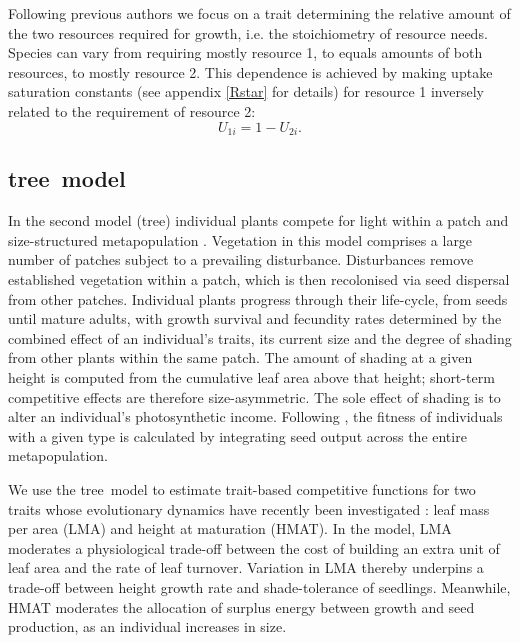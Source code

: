 \documentclass[a4paper,11pt]{article}
\newcommand{\TREE}{{\sc tree}}
\begin{document}
Following previous authors \citep{Tilman-1985, Schreiber-2003, Fox-2008} we
focus on a trait determining the relative amount of the two resources
required for growth, i.e. the stoichiometry of resource needs. Species can
vary from requiring mostly resource 1, to equals amounts of both resources, to
mostly resource 2. This dependence is achieved by making uptake saturation
constants (see appendix  \ref{Rstar} for details) for resource 1 inversely related
to the requirement of resource 2:
\begin{equation}
\label{eq:R3}
U_{1i} = 1-U_{2i}.
\end{equation}

\subsection{\TREE\ model}

In the second model (\TREE) individual plants compete for light within a patch
and size-structured metapopulation \citep{Falster-2011, Falster-2015}.
Vegetation in this model comprises a large number of patches subject to a
prevailing disturbance. Disturbances remove established vegetation within a
patch, which is then recolonised via seed dispersal from other patches.
Individual plants progress through their life-cycle, from seeds until mature
adults, with growth survival and fecundity rates determined by the combined
effect of an individual's traits, its current size and the degree of shading
from other plants within the same patch. The amount of shading at a given
height is computed from the cumulative leaf area above that height; short-term
competitive effects are therefore size-asymmetric. The sole effect of shading
is to alter an individual's photosynthetic income. Following
\citep{Falster-2015}, the fitness of individuals with a given type is
calculated by integrating seed output across the entire metapopulation.

We use the \TREE\ model to estimate trait-based competitive functions for
two traits whose evolutionary dynamics have recently been investigated
\citep{Falster-2015}: leaf mass per area (LMA) and height at maturation
(HMAT). In the model, LMA moderates a physiological trade-off between the cost
of building an extra unit of leaf area and the rate of leaf turnover.
Variation in LMA thereby underpins a trade-off between height growth rate and
shade-tolerance of seedlings. Meanwhile, HMAT moderates the allocation of
surplus energy between growth and seed production, as an individual increases in
size.
\end{document}
